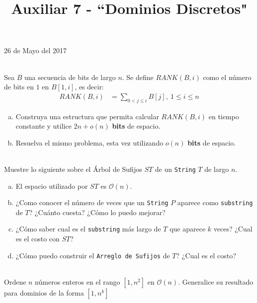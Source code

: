 \documentclass[dcc,uchile]{fcfmcourse}
\title{Auxiliar 7 - ``Dominios Discretos"}
\begin{document}
\maketitle
\begin{center}
26 de Mayo del 2017
\end{center}
\vspace{-1ex}


\begin{problems}
\\
Sea $B$ una secuencia de bits de largo $n$. Se define $RANK(B, i)$ como el número de bits en $1$ en $B[1,i]$, es decir:
\begin{align*}
    RANK(B, i) &= \sum_{0<j\le i} B[j],\ 1\le i \le n
\end{align*}
\begin{enumerate}[a)]
    \item Construya una estructura que permita calcular $RANK(B,i)$ en tiempo constante y utilice $2n + o(n)$ \textbf{bits} de espacio.
    \item Resuelva el mismo problema, esta vez utilizando $o(n)$ \textbf{bits} de espacio.
\end{enumerate}

\\
Muestre lo siguiente sobre el Árbol de Sufijos $ST$ de un  \texttt{String} $T$ de largo $n$.
\begin{enumerate}[a)]
    \item El espacio utilizado por $ST$ es $\mathcal{O}(n)$.
    \item ¿Como conocer el número de veces que un \texttt{String} $P$ aparece como \texttt{substring} de $T$? ¿Cuánto cuesta? ¿Cómo lo puedo mejorar?
    \item ¿Cómo saber cual es el \texttt{substring} más largo de $T$  que aparece $k$ veces? ¿Cual es el costo con $ST$?
    \item ¿Cómo puedo construir el \texttt{Arreglo de Sufijos} de $T$? ¿Cual es el costo?
\end{enumerate}


\\
Ordene $n$ números enteros en el rango $[1, n^2]$ en $\mathcal{O}(n)$. Generalice su resultado para dominios  de la forma $[1, n^k]$
\end{problems}
\end{document}
